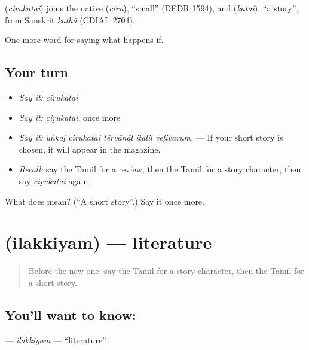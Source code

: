 \begin{cousinweb}
\textbf{} (\emph{ciṟukatai}) joins the native  (\emph{ciṟu}), \textquotedblleft{}small\textquotedblright{} (DEDR 1594), and  (\emph{katai}), \textquotedblleft{}a story\textquotedblright{}, from Sanskrit \emph{kathā} (CDIAL 2704).
\end{cousinweb}

\begin{grammarlens}[title={What you've built}]
One more word for saying what happens if.
\end{grammarlens}

\subsection*{Your turn}
\begin{itemize}
\raggedright
  \item \emph{Say it:} \emph{ciṟukatai}
  \item \emph{Say it:} \emph{ciṟukatai}, once more
  \item \emph{Say it:} \emph{uṅkaḷ ciṟukatai tērvāṉāl itaḻil veḷivarum.} — If your short story is chosen, it will appear in the magazine.
  \item \emph{Recall:} say the Tamil for a review, then the Tamil for a story character, then say \emph{ciṟukatai} again
\end{itemize}

\begin{tcolorbox}[breakable,colback=teal!4,colframe=teal!35!black,title={Before you move on}]
What does  mean? (\textquotedblleft{}A short story\textquotedblright{}.) Say it once more.
\end{tcolorbox}
\section[\texorpdfstring{\ta{இலக்கியம்} (ilakkiyam)}{இலக்கியம் (ilakkiyam)}]{ (ilakkiyam) — literature}

\label{lesson:TA-C556-ilakkiyam}



\begin{quote}
Before the new one: say the Tamil for a story character, then the Tamil for a short story.
\end{quote}

\subsection*{You'll want to know: }
\textbf{} — \emph{ilakkiyam} — \textquotedblleft{}literature\textquotedblright{}.

